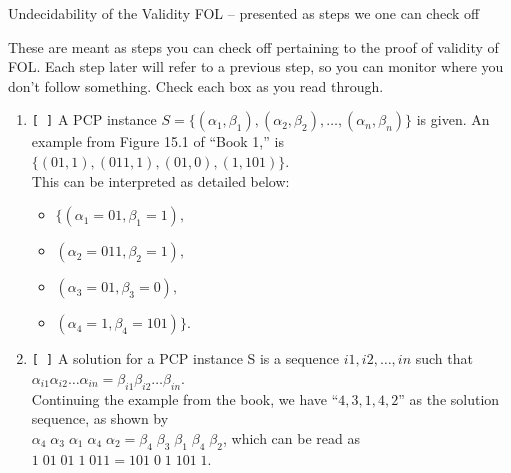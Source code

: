 \documentclass[11pt]{article}
\begin{document}



\begin{center}
\begin{Large}
\sf Undecidability of the Validity FOL -- presented as steps we one can check off
\end{Large}
\end{center}

\begin{Large}

\noindent These are meant as steps you can check off pertaining to the proof of validity of FOL. Each step
later will refer to a previous step, so you can monitor where you don't follow something.
%
Check each box as you read through.



\begin{enumerate}
\item \verb|[ ]| \label{step1}
  A PCP instance $S = \{(\alpha_1, \beta_1), (\alpha_2, \beta_2), \ldots, (\alpha_n, \beta_n) \}$ is given.
  An example from Figure 15.1 of ``Book 1,'' is
  $\{(01,1), (011,1), (01,0), (1,101)\}$. \\
  This can be interpreted as detailed below:
  \begin{itemize}
  \item[]
    $\{(\alpha_1 = 01, \beta_1 = 1),$
  \item[] $ (\alpha_2 = 011, \beta_ 2 = 1),$
   \item[] $ (\alpha_3 = 01,  \beta_3 = 0),$
   \item[]  $ (\alpha_4 = 1,   \beta_4 = 101)\}$.
  \end{itemize}
  
\item \verb|[ ]| A solution for a PCP instance S is a sequence
  ${i1}, {i2}, \ldots, {in}$ such that \\
  $\alpha_{i1} \alpha_{i2} \ldots \alpha_{in} =
   \beta_{i1} \beta_{i2} \ldots \beta_{in}$. \\
  Continuing the example from the book, we have ``$4,3,1,4,2$'' as the
  solution sequence, as shown by \\
  $\alpha_{4} \;  \alpha_{3}  \; \alpha_{1} \; \alpha_{4} \; \alpha_{2} =
  \beta_{4} \; \beta_{3}  \; \beta_{1} \; \beta_{4} \; \beta_{2}$, which
  can be read as  \\
  $1\; 01\; 0    1 \; 1\; 01   1 =
   1   01\; 0 \; 1\;  1   01\; 1$.  


\end{enumerate}
\end{Large}
\end{document}
